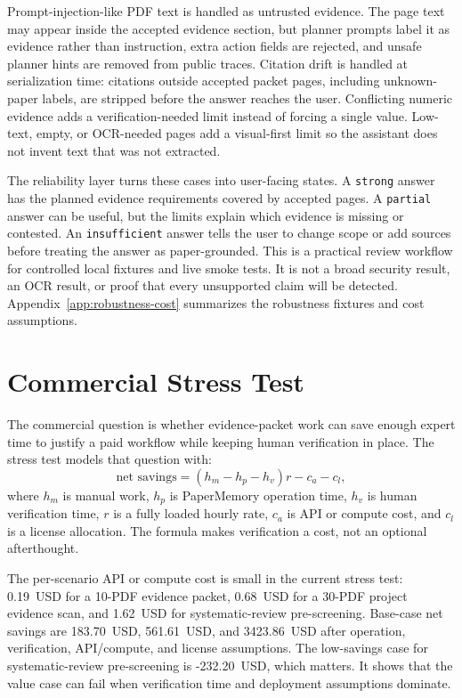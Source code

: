 \documentclass{article}
\begin{document}
Prompt-injection-like PDF text is handled as untrusted evidence. The page text may appear inside the accepted evidence section, but planner prompts label it as evidence rather than instruction, extra action fields are rejected, and unsafe planner hints are removed from public traces. Citation drift is handled at serialization time: citations outside accepted packet pages, including unknown-paper labels, are stripped before the answer reaches the user. Conflicting numeric evidence adds a verification-needed limit instead of forcing a single value. Low-text, empty, or OCR-needed pages add a visual-first limit so the assistant does not invent text that was not extracted.

The reliability layer turns these cases into user-facing states. A \texttt{strong} answer has the planned evidence requirements covered by accepted pages. A \texttt{partial} answer can be useful, but the limits explain which evidence is missing or contested. An \texttt{insufficient} answer tells the user to change scope or add sources before treating the answer as paper-grounded. This is a practical review workflow for controlled local fixtures and live smoke tests. It is not a broad security result, an OCR result, or proof that every unsupported claim will be detected. Appendix~\ref{app:robustness-cost} summarizes the robustness fixtures and cost assumptions.

\section{Commercial Stress Test}
\label{sec:commercial-stress}

The commercial question is whether evidence-packet work can save enough expert time to justify a paid workflow while keeping human verification in place. The stress test models that question with:
\[
\text{net savings} = (h_m - h_p - h_v) r - c_a - c_l,
\]
where $h_m$ is manual work, $h_p$ is PaperMemory operation time, $h_v$ is human verification time, $r$ is a fully loaded hourly rate, $c_a$ is API or compute cost, and $c_l$ is a license allocation. The formula makes verification a cost, not an optional afterthought.



The per-scenario API or compute cost is small in the current stress test: 0.19~USD for a 10-PDF evidence packet, 0.68~USD for a 30-PDF project evidence scan, and 1.62~USD for systematic-review pre-screening. Base-case net savings are 183.70~USD, 561.61~USD, and 3423.86~USD after operation, verification, API/compute, and license assumptions. The low-savings case for systematic-review pre-screening is -232.20~USD, which matters. It shows that the value case can fail when verification time and deployment assumptions dominate.
\end{document}
